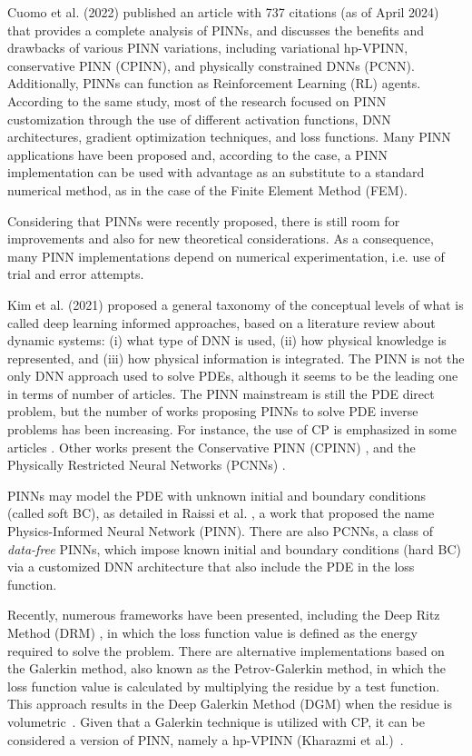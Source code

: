 \documentclass[conference]{IEEEtran}
\begin{document}
Cuomo et al. (2022) \cite{Cuomo2022} published an article with 737 citations (as of April 2024) that provides a complete analysis of PINNs, and discusses the benefits and drawbacks of various PINN variations, including variational hp-VPINN, conservative PINN (CPINN), and physically constrained DNNs (PCNN). Additionally, PINNs can function as Reinforcement Learning (RL) agents. According to the same study, most of the research focused on PINN customization through the use of different activation functions, DNN architectures, gradient optimization techniques, and loss functions. Many PINN applications have been proposed and, according to the case, a PINN implementation can be used with advantage as an substitute to a standard numerical method, as in the case of the  Finite Element Method (FEM).

Considering that PINNs were recently proposed, there is still room for improvements and also for new theoretical considerations. As a consequence, many PINN implementations depend on numerical experimentation, i.e. use of trial and error attempts.


Kim et al. (2021) \cite{Kim2021} proposed a general taxonomy of the conceptual levels of what is called deep learning informed approaches, based on a literature review about dynamic systems: (i) what type of DNN is used, (ii) how physical knowledge is represented, and (iii) how physical information is integrated.
The PINN is not the only DNN approach used to solve PDEs, although it seems to be the leading one in terms of number of articles. The PINN mainstream is still the PDE direct problem, but the number of works proposing PINNs to solve PDE inverse problems has been increasing. For instance, the use of CP is emphasized in some articles \cite{Meng2020,Yang2019,Raissi2019}. Other works present the Conservative PINN (CPINN) \cite{Jagtap2020}, and the Physically Restricted Neural Networks (PCNNs) \cite{Zhu2019,Sun2020,Liu2021}.

PINNs may model the PDE with unknown initial and boundary conditions (called soft BC), as detailed in Raissi et al. \cite{Raissi2019}, a work that proposed the name Physics-Informed Neural Network (PINN). There are also PCNNs, a class of \textit{data-free} PINNs, which impose known initial and boundary conditions (hard BC) via a customized DNN architecture that also include the PDE in the loss function. 

Recently, numerous frameworks have been presented, including the Deep Ritz Method (DRM) \cite{E2017}, in which the loss function value is defined as the energy required to solve the problem. There are alternative implementations based on the Galerkin method, also known as the Petrov-Galerkin method, in which the loss function value is calculated by multiplying the residue by a test function. This approach results in the Deep Galerkin Method (DGM) when the residue is volumetric~\cite{Sirignano2018}. Given that a Galerkin technique is utilized with CP, it can be considered a version of PINN, namely a hp-VPINN (Kharazmi et al.)~\cite{Kharazmi2021}.
\end{document}
